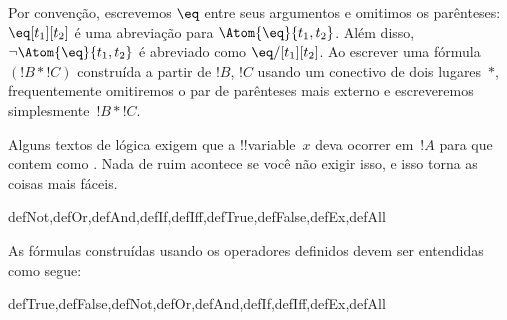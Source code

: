 \documentclass[../../../include/open-logic-section]{subfiles}
\begin{document}
Por convenção, escrevemos $\eq$ entre seus argumentos e omitimos os
parênteses: $\eq[t_1][t_2]$ é uma abreviação para
$\Atom{\eq}{t_1,t_2}$.  Além disso, $\lnot \Atom{\eq}{t_1,t_2}$ é
abreviado como $\eq/[t_1][t_2]$. Ao escrever uma fórmula $(!B \ast !C)$
construída a partir de $!B$, $!C$ usando um conectivo de dois lugares~$\ast$,
frequentemente omitiremos o par de parênteses mais externo e escreveremos
simplesmente~$!B \ast !C$.

\begin{intro}
Alguns textos de lógica exigem que a !!{variable}~$x$ deva ocorrer em~$!A$
para que
%
%
%
contem como
.
Nada de ruim acontece se você não exigir isso, e isso torna as coisas
mais fáceis.
\end{intro}

\begin{tagblock}{defNot,defOr,defAnd,defIf,defIff,defTrue,defFalse,defEx,defAll}
\begin{defn}
As fórmulas construídas usando os operadores definidos devem ser entendidas
como segue:

\begin{tagenumerate}{defTrue,defFalse,defNot,defOr,defAnd,defIf,defIff,defEx,defAll}









\end{tagenumerate}
\end{defn}
\end{tagblock}
\end{document}
